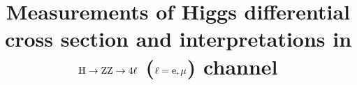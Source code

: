 \newcommand{\Zone}{\mathrm{Z}}
\newcommand{\MassD}{\mathrm{{\cal D}_{\rm mass}} }
\newcommand{\MassDprime}{\mathrm{{\cal D}'_{\rm mass}} }
\newcommand{\LikMass}{\mathcal{L}_{3D}^{m,\Gamma} }
\newcommand{\LikMassTwoD}{\mathcal{L}_{2D}^{m,\Gamma} }
\newcommand{\LikMassOneD}{\mathcal{L}_{1D}^{m,\Gamma} }
\newcommand{\LikMuOneD}{\mathrm{{\cal L}_{1D}(m_{4l})} }
\newcommand{\LikMuTwoD}{\mathrm{{\cal L}_{2D}(m_{4l},\KD)} }
\newcommand{\LikMuOneDPrime}{\mathrm{{\cal L}_{1D}(m_{4l}')} }
\newcommand{\LikMuTwoDPrime}{\mathrm{{\cal L}_{2D}(m_{4l}',\KD)} }
\newcommand{\muV}{\ensuremath{\mu_{\mathrm{VBF},\mathrm{V\PH}}} }
\newcommand{\muF}{\ensuremath{\mu_{\Pg\Pg\PH,\,\ttbar\PH}} }
\providecommand{\cmsTable}[1]{\resizebox{\textwidth}{!}{#1}}

\newcommand{\usedLumiA}{36.8\fbinv}
\newcommand{\usedLumiB}{41.4\fbinv}
\newcommand{\usedLumiC}{58.8\fbinv}
\newcommand{\usedLumiABC}{137\fbinv}
\newcommand{\posOfPValueMinimum}{12X.X}
\newcommand{\expSignAtMinimum}{xx.x}
\newcommand{\obsSignAtMinimum}{yy.y}
\newcommand{\expSignAtRunIMass}{10.5}
\newcommand{\obsSignAtRunIMass}{10.8}
\newcommand{\valMuAtRunIMass}{\ensuremath{1.11^{+0.19}_{-0.17}}}
\newcommand{\valMuVAtRunIMass}{\ensuremath{0.98}^{+0.92}_{-0.68}}
\newcommand{\valMuFAtRunIMass}{\ensuremath{1.17}^{+0.19}_{-0.18}}
\newcommand{\valMass}{\ensuremath{12X.XX^{+0.xx}_{-0.yy}}}
\newcommand{\valMassThreeDRefit}{\ensuremath{125.25 \pm 0.20 (\mathrm{stat.}) \pm 0.08 (\mathrm{sys.})}}
\newcommand{\valMuV}{\ensuremath{0.82}^{+0.36}_{-0.31}}
\newcommand{\valMuF}{\ensuremath{0.96}^{+0.14}_{-0.12}}


\newcommand{\Dbkgkin}{\ensuremath{{\mathcal{D}}^{\mathrm{kin}}_{\mathrm{bkg}}}\xspace}
\newcommand{\DbkgVBFdec}{\ensuremath{{\mathcal{D}}^{\mathrm{VBF}+\mathrm{dec}}_{\mathrm{bkg}}}\xspace}
\newcommand{\DbkgVHdec}{\ensuremath{{\mathcal{D}}^{\mathrm{VH}+\mathrm{dec}}_{\mathrm{bkg}}}\xspace}


\title{Measurements of Higgs differential cross section and interpretations in $\mathrm{H}\rightarrow{\rm Z}{\rm Z}\rightarrow4\ell$ ($\ell={\rm e},\mu$) channel}


